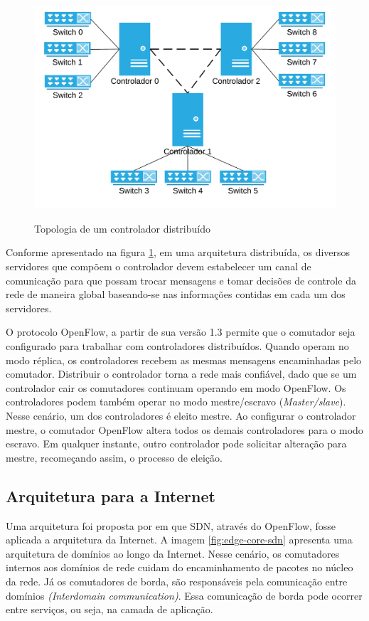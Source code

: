 \begin{figure}[h!]
    \centering
    \includegraphics{img/distributed-controller}
    \label{fig:distributed-controller}
    \caption{Topologia de um controlador distribuído}
\end{figure}

Conforme apresentado na figura \ref{fig:distributed-controller}, em uma
arquitetura distribuída, os diversos servidores que compõem o controlador
devem estabelecer um canal de comunicação para que possam trocar mensagens
e tomar decisões de controle da rede de maneira global baseando-se nas
informações contidas em cada um dos servidores.

O protocolo OpenFlow, a partir de sua versão 1.3 permite que o comutador seja 
configurado para trabalhar com controladores distribuídos.
Quando operam no modo réplica, os controladores recebem as mesmas mensagens
encaminhadas pelo comutador.
Distribuir o controlador torna a rede mais confiável, dado que se um 
controlador cair os comutadores continuam operando em modo OpenFlow.
Os controladores podem também operar no modo mestre/escravo 
(\emph{Master/slave}).
Nesse cenário, um dos controladores é eleito mestre. 
Ao configurar o controlador mestre, o comutador OpenFlow altera todos os demais
controladores para o modo escravo. 
Em qualquer instante, outro controlador pode solicitar alteração para 
mestre, recomeçando assim, o processo de eleição.


\subsection{Arquitetura para a Internet}

Uma arquitetura foi proposta por \citep{barath2012software} em que SDN, 
através do OpenFlow, fosse aplicada a arquitetura da Internet. 
A imagem \ref{fig:edge-core-sdn} apresenta uma arquitetura de domínios 
ao longo da Internet.
Nesse cenário, os comutadores internos aos domínios de rede cuidam do 
encaminhamento de pacotes no núcleo da rede.
Já os comutadores de borda, são responsáveis pela comunicação entre domínios
\emph{(Interdomain communication)}.
Essa comunicação de borda pode ocorrer entre serviços, ou seja,
na camada de aplicação.

